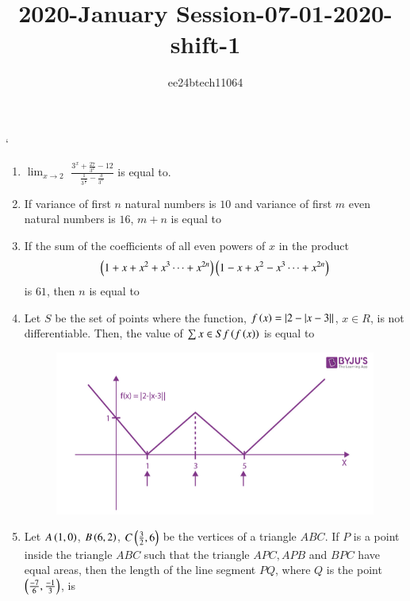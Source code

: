\documentclass[journal,12pt,twocolumn]{IEEEtran}
\theoremstyle{remark}
\begin{document}

\vspace{3cm}

\title{2020-January Session-07-01-2020-shift-1}
\author{ee24btech11064}
\maketitle
\newpage
\bigskip

\renewcommand{\thefigure}{\theenumi}
`\renewcommand{\thetable}{\theenumi}
\begin{enumerate}
\item $\lim_{x\to2}$ $\frac{3^x+\frac{27}{3^x}-12}{\frac{1}{3^\frac{x}{2}}-\frac{3}{3^x}}$ is equal to.\\
\item If variance of first $n$ natural numbers is $10$ and variance of first $m$ even natural numbers is $16$, $m + n$ is equal to\\
\item  If the sum of the coefficients of all even powers of $x$ in the product
\begin{align*}
    \left(1+x+x^2+x^3\cdots+x^{2n}\right)\left(1-x+x^2-x^3\cdots+x^{2n}\right)
\end{align*}
is $61$, then $n$ is equal to \\
\item Let $S$ be the set of points where the function, $f\left(x\right)=|2-|x-3||$, $x \in R$, is not differentiable. Then, the value of $\sum x \in S f\left(f\left(x\right)\right)$ is equal to
\begin{figure}[h!]
   \centering
   \includegraphics[width=\linewidth]{q24.png}
   \caption{}
   \label{stemplot}
\end{figure}
\item Let $A\left(1,0\right)$, $B\left(6,2\right)$, $C\left(\frac{3}{2},6\right)$ be the vertices of a triangle $ABC$. If $P$ is a point inside the triangle $ABC$ such that the triangle $APC,APB$ and $BPC$ have equal areas, then the length of the line segment $PQ$, where $Q$ is the point $\left(\frac{-7}{6},\frac{-1}{3}\right)$, is 
\end{enumerate}
\end{document}
